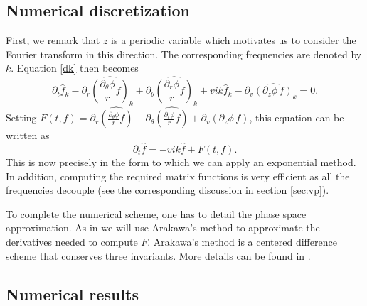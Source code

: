 \subsection{Numerical discretization}

First, we remark that $z$ is a periodic variable which motivates us to consider the Fourier transform in this direction. The corresponding frequencies are denoted by $k$. Equation \eqref{dk} then becomes
$$
  \partial_t \hat{f}_k -\partial_r \widehat{\left(\frac{\partial_\theta \phi}{r}f\right)}_k+\partial_\theta \widehat{\left(\frac{\partial_r \phi}{r} f\right)}_k +vik \hat{f}_k-\partial_v\widehat{\left( \partial_z\phi \, f\right)}_k=0.
$$
Setting $F(t, f)= \partial_r \widehat{\left(\frac{\partial_\theta \phi}{r}f\right)}-\partial_\theta \widehat{\left(\frac{\partial_r \phi}{r} f\right)} +\partial_v\widehat{\left( \partial_z\phi \,f\right)}$, this equation can be written as
$$
  \partial_t \hat{f} = - vik \hat{f} + F(t, f). 
$$
This is now precisely in the form to which we can apply an exponential method. In addition, computing the required matrix functions is very efficient as all the frequencies decouple (see the corresponding discussion in section \ref{sec:vp}).

To complete the numerical scheme, one has to detail the phase space approximation. As in \cite{Crouseilles:2018} we will use Arakawa's method to approximate the derivatives needed to compute $F$. Arakawa's method is a centered difference scheme that conserves three invariants. More details can be found in \cite{Crouseilles:2018}.



\subsection{Numerical results \label{subsec:driftkinetic-results}}

